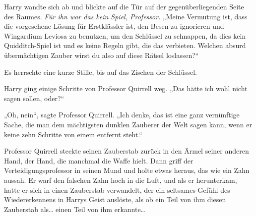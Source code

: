Harry wandte sich ab und blickte auf die Tür auf der gegenüberliegenden Seite des Raumes.
\emph{Für ihn war das kein Spiel, Professor.}
„Meine Vermutung ist, dass die vorgesehene Lösung für Erstklässler ist, den Besen zu ignorieren und Wingardium Leviosa zu benutzen, um den Schlüssel zu schnappen, da dies kein Quidditch-Spiel ist und es keine Regeln gibt, die das verbieten. Welchen absurd übermächtigen Zauber wirst du also auf diese Rätsel loslassen?“

Es herrschte eine kurze Stille, bis auf das Zischen der Schlüssel.

Harry ging einige Schritte von Professor Quirrell weg.
„Das hätte ich wohl nicht sagen sollen, oder?“

„Oh, nein“, sagte Professor Quirrell. „Ich denke, das ist eine ganz vernünftige Sache, die man dem mächtigsten dunklen Zauberer der Welt sagen kann, wenn er keine zehn Schritte von einem entfernt steht.“

Professor Quirrell steckte seinen Zauberstab zurück in den Ärmel seiner anderen Hand, der Hand, die manchmal die Waffe hielt.
Dann griff der Verteidigungsprofessor in seinen Mund und holte etwas heraus, das wie ein Zahn aussah. Er warf den falschen Zahn hoch in die Luft, und als er herunterkam, hatte er sich in einen Zauberstab verwandelt, der ein seltsames Gefühl des Wiedererkennens in Harrys Geist auslöste, als ob ein Teil von ihm diesen Zauberstab als… einen Teil von ihm erkannte…

